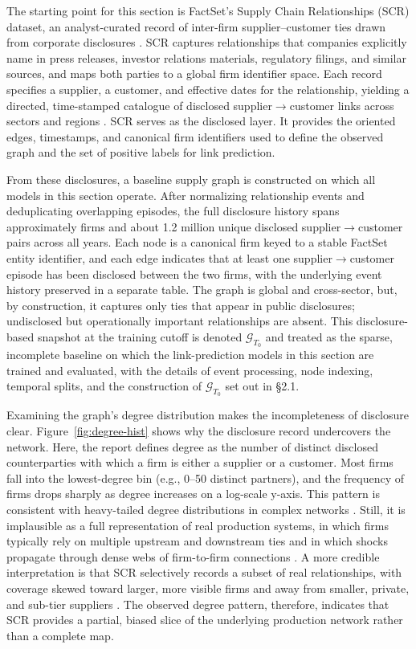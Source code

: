 The starting point for this section is FactSet's Supply Chain Relationships (SCR) dataset, an analyst-curated record of inter-firm supplier--customer ties drawn from corporate disclosures \parencite{factset_supply_2024}. SCR captures relationships that companies explicitly name in press releases, investor relations materials, regulatory filings, and similar sources, and maps both parties to a global firm identifier space. Each record specifies a supplier, a customer, and effective dates for the relationship, yielding a directed, time-stamped catalogue of disclosed supplier$\rightarrow$customer links across sectors and regions \parencite{factset_supply_2024}. SCR serves as the disclosed layer. It provides the oriented edges, timestamps, and canonical firm identifiers used to define the observed graph and the set of positive labels for link prediction.

From these disclosures, a baseline supply graph is constructed on which all models in this section operate. After normalizing relationship events and deduplicating overlapping episodes, the full disclosure history spans approximately \NumFirms firms and about 1.2 million unique disclosed supplier$\rightarrow$customer pairs across all years. Each node is a canonical firm keyed to a stable FactSet entity identifier, and each edge indicates that at least one supplier$\rightarrow$customer episode has been disclosed between the two firms, with the underlying event history preserved in a separate table. The graph is global and cross-sector, but, by construction, it captures only ties that appear in public disclosures; undisclosed but operationally important relationships are absent. This disclosure-based snapshot at the training cutoff is denoted $\mathcal{G}_{T_0}$ and treated as the sparse, incomplete baseline on which the link-prediction models in this section are trained and evaluated, with the details of event processing, node indexing, temporal splits, and the construction of $\mathcal{G}_{T_0}$ set out in \S2.1.

Examining the graph's degree distribution makes the incompleteness of disclosure clear. Figure~\ref{fig:degree-hist} shows why the disclosure record undercovers the network. Here, the report defines degree as the number of distinct disclosed counterparties with which a firm is either a supplier or a customer. Most firms fall into the lowest-degree bin (e.g., 0--50 distinct partners), and the frequency of firms drops sharply as degree increases on a log-scale y-axis. This pattern is consistent with heavy-tailed degree distributions in complex networks \parencite{barabasi_emergence_1999}. Still, it is implausible as a full representation of real production systems, in which firms typically rely on multiple upstream and downstream ties and in which shocks propagate through dense webs of firm-to-firm connections \parencite{inoue_firm-level_2019}. A more credible interpretation is that SCR selectively records a subset of real relationships, with coverage skewed toward larger, more visible firms and away from smaller, private, and sub-tier suppliers \parencite{gopal_discovering_2021}. The observed degree pattern, therefore, indicates that SCR provides a partial, biased slice of the underlying production network rather than a complete map.

